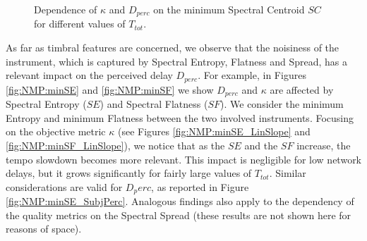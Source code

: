 \begin{figure}[!tb]
\begin{flushright}
    \hfil
\end{flushright}
\caption{Dependence of $\kappa$ and $D_{perc}$ on the minimum Spectral Centroid $SC$ for different values of $T_{tot}$.}
\label{fig:NMP:minSC}
\end{figure}



As far as timbral features are concerned, we observe that the noisiness of the instrument, which is captured by Spectral Entropy, Flatness and Spread, has a relevant impact on the perceived delay $D_{perc}$. For example, in Figures \ref{fig:NMP:minSE} and \ref{fig:NMP:minSF} we show $D_{perc}$ and $\kappa$ are affected by Spectral Entropy ($SE$) and Spectral Flatness ($SF$). We consider the minimum Entropy and minimum Flatness between the two involved instruments. Focusing on the objective metric $\kappa$ (see Figures \ref{fig:NMP:minSE_LinSlope} and \ref{fig:NMP:minSF_LinSlope}), we notice that as the $SE$ and the $SF$ increase, the tempo slowdown becomes more relevant. This impact is negligible for low network delays, but it grows significantly for fairly large values of $T_{tot}$. Similar considerations are valid for $D_perc$, as reported in Figure \ref{fig:NMP:minSE_SubjPerc}. Analogous findings also apply to the dependency of the quality metrics on the Spectral Spread (these results are not shown here for reasons of space). 

